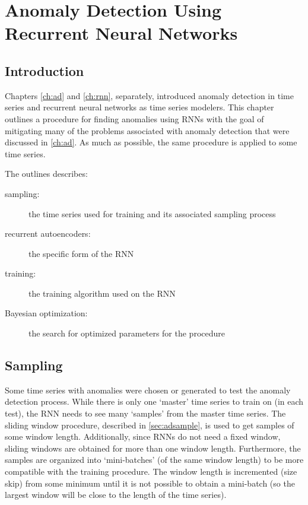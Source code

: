 \chapter[]{Anomaly Detection Using Recurrent Neural Networks}


\section{Introduction}

Chapters \ref{ch:ad} and \ref{ch:rnn}, separately, introduced anomaly detection in time series and recurrent neural networks as time series modelers.
%
This chapter outlines a procedure for finding anomalies using RNNs with the goal of mitigating many of the problems associated with anomaly detection that were discussed in \ref{ch:ad}.
%
As much as possible, the same procedure is applied to some time series.


The outlines describes:
%
\begin{description}
%
\item[sampling:] the time series used for training and its associated sampling process
%
\item[recurrent autoencoders:] the specific form of the RNN
%
\item[training:] the training algorithm used on the RNN
%
\item[Bayesian optimization:] the search for optimized parameters for the procedure
%
\end{description}



\section{Sampling}


Some time series with anomalies were chosen or generated to test the anomaly detection process.
%
While there is only one `master' time series to train on (in each test), the RNN needs to see many `samples' from the master time series.
%
The sliding window procedure, described in \ref{sec:adsample}, is used to get samples of some window length.
%
Additionally, since RNNs do not need a fixed window, sliding windows are obtained for more than one window length.
%
Furthermore, the samples are organized into `mini-batches' (of the same window length) to be more compatible with the training procedure.
%
The window length is incremented (size skip) from some minimum until it is not possible to obtain a mini-batch (so the largest window will be close to the length of the time series).


